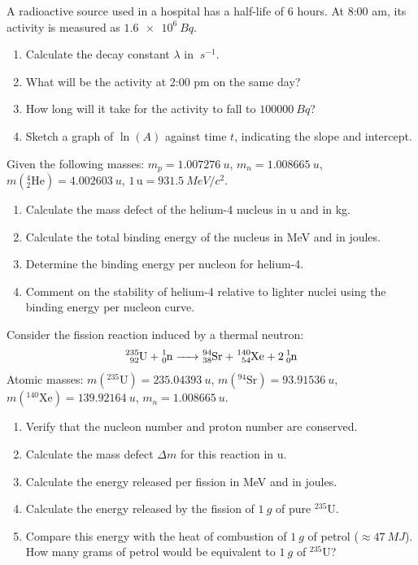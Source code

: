 \documentclass[11pt]{article}
\newcounter{popsec}
\newcounter{popsub}
\newcommand{\courssub}[1]{%
  \stepcounter{popsub}%
  \par\vspace{9pt}\noindent{\popxbold\fontsize{11.5}{13}\selectfont\color{popink}{\color{poporange}\thepopsec.\thepopsub}\hspace{6pt}#1}\par\nopagebreak\vspace{4pt}
}
\begin{document}
\courssub{I practise}

\begin{exercice}
A radioactive source used in a hospital has a half-life of 6 hours. At 8:00 am, its activity is measured as $\SI{1.6e6}{Bq}$.
\begin{enumerate}
    \item Calculate the decay constant $\lambda$ in $\SI{}{s^{-1}}$.
    \item What will be the activity at 2:00 pm on the same day?
    \item How long will it take for the activity to fall to $\SI{100000}{Bq}$?
    \item Sketch a graph of $\ln(A)$ against time $t$, indicating the slope and intercept.
\end{enumerate}
\end{exercice}

\begin{exercice}
Given the following masses:
$m_p = \SI{1.007276}{u}$, $m_n = \SI{1.008665}{u}$, $m(^{4}_{2}\text{He}) = \SI{4.002603}{u}$, $1\,\text{u} = \SI{931.5}{MeV/c^2}$.
\begin{enumerate}
    \item Calculate the mass defect of the helium-4 nucleus in u and in kg.
    \item Calculate the total binding energy of the nucleus in MeV and in joules.
    \item Determine the binding energy per nucleon for helium-4.
    \item Comment on the stability of helium-4 relative to lighter nuclei using the binding energy per nucleon curve.
\end{enumerate}
\end{exercice}

\begin{exercice}
Consider the fission reaction induced by a thermal neutron:
\[\ce{^{235}_{92}U + ^{1}_{0}n -> ^{94}_{38}Sr + ^{140}_{54}Xe + 2^{1}_{0}n}\]
Atomic masses: $m(^{235}\text{U}) = \SI{235.04393}{u}$, $m(^{94}\text{Sr}) = \SI{93.91536}{u}$, $m(^{140}\text{Xe}) = \SI{139.92164}{u}$, $m_n = \SI{1.008665}{u}$.
\begin{enumerate}
    \item Verify that the nucleon number and proton number are conserved.
    \item Calculate the mass defect $\Delta m$ for this reaction in u.
    \item Calculate the energy released per fission in MeV and in joules.
    \item Calculate the energy released by the fission of $\SI{1}{g}$ of pure $^{235}\text{U}$.
    \item Compare this energy with the heat of combustion of $\SI{1}{g}$ of petrol ($\approx \SI{47}{MJ}$). How many grams of petrol would be equivalent to $\SI{1}{g}$ of $^{235}\text{U}$?
\end{enumerate}
\end{exercice}
\end{document}
